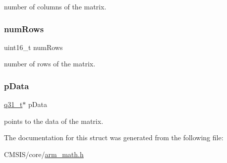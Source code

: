 number of columns of the matrix. \mbox{\label{structarm__matrix__instance__q31_a1bcf80ccdc2acc29198f1592ae300390}} 
\subsubsection{\texorpdfstring{numRows}{numRows}}
{\footnotesize\ttfamily uint16\+\_\+t num\+Rows}

number of rows of the matrix. \mbox{\label{structarm__matrix__instance__q31_ad296f76577326ff280726323536eed6d}} 
\subsubsection{\texorpdfstring{pData}{pData}}
{\footnotesize\ttfamily \mbox{\hyperlink{arm__math_8h_adc89a3547f5324b7b3b95adec3806bc0}{q31\+\_\+t}}$\ast$ p\+Data}

points to the data of the matrix. 

The documentation for this struct was generated from the following file\+:\begin{DoxyCompactItemize}
\item 
C\+M\+S\+I\+S/core/\mbox{\hyperlink{arm__math_8h}{arm\+\_\+math.\+h}}\end{DoxyCompactItemize}
